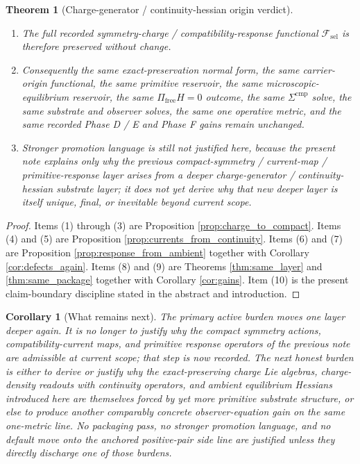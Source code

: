 \documentclass[11pt]{article}
\newcommand{\StemFunctional}{\mathscr F_{\mathrm{sel}}}
\newtheorem{corollary}{Corollary}
\newtheorem{theorem}{Theorem}
\begin{document}
\begin{theorem}[Charge-generator / continuity-hessian origin verdict]
\begin{enumerate}
    \item The full recorded symmetry-charge / compatibility-response functional \(\StemFunctional\) is therefore preserved without change.
    \item Consequently the same exact-preservation normal form, the same carrier-origin functional, the same primitive reservoir, the same microscopic-equilibrium reservoir, the same \(\Pi_{\mathrm{free}}H=0\) outcome, the same \(\Sigma^{\mathrm{cmp}}\) solve, the same substrate and observer solves, the same one operative metric, and the same recorded Phase D / E and Phase F gains remain unchanged.
    \item Stronger promotion language is still not justified here, because the present note explains only why the previous compact-symmetry / current-map / primitive-response layer arises from a deeper charge-generator / continuity-hessian substrate layer; it does not yet derive why that new deeper layer is itself unique, final, or inevitable beyond current scope.
\end{enumerate}
\end{theorem}

\begin{proof}
Items (1) through (3) are Proposition \ref{prop:charge_to_compact}. Items (4) and (5) are Proposition \ref{prop:currents_from_continuity}. Items (6) and (7) are Proposition \ref{prop:response_from_ambient} together with Corollary \ref{cor:defects_again}. Items (8) and (9) are Theorems \ref{thm:same_layer} and \ref{thm:same_package} together with Corollary \ref{cor:gains}. Item (10) is the present claim-boundary discipline stated in the abstract and introduction.
\end{proof}

\begin{corollary}[What remains next]
\label{cor:what_next}
The primary active burden moves one layer deeper again. It is no longer to justify why the compact symmetry actions, compatibility-current maps, and primitive response operators of the previous note are admissible at current scope; that step is now recorded. The next honest burden is either to derive or justify why the exact-preserving charge Lie algebras, charge-density readouts with continuity operators, and ambient equilibrium Hessians introduced here are themselves forced by yet more primitive substrate structure, or else to produce another comparably concrete observer-equation gain on the same one-metric line. No packaging pass, no stronger promotion language, and no default move onto the anchored positive-pair side line are justified unless they directly discharge one of those burdens.
\end{corollary}
\end{document}
